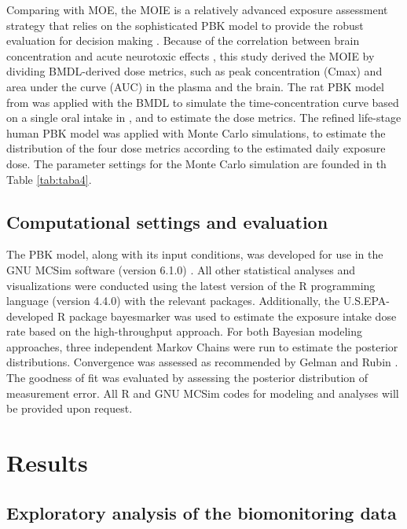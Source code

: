 \documentclass[toxics,article,submit,pdftex,moreauthors]{Definitions/mdpi}
\begin{document}
Comparing with MOE, the MOIE is a relatively advanced exposure
assessment strategy that relies on the sophisticated PBK model to
provide the robust evaluation for decision making
\citep{bessems_margin_2017}. Because of the correlation between brain
concentration and acute neurotoxic effects
\citep{scollon_correlation_2011}, this study derived the MOIE by
dividing BMDL-derived dose metrics, such as peak concentration (Cmax)
and area under the curve (AUC) in the plasma and the brain. The rat PBK
model from \citet{song2019evaluation} was applied with the BMDL to
simulate the time-concentration curve based on a single oral intake in
\citet{wolansky_relative_2006}, and to estimate the dose metrics. The
refined life-stage human PBK model was applied with Monte Carlo
simulations, to estimate the distribution of the four dose metrics
according to the estimated daily exposure dose. The parameter settings
for the Monte Carlo simulation are founded in th Table \ref{tab:taba4}.

\subsection{Computational settings and
evaluation}\label{computational-settings-and-evaluation}

The PBK model, along with its input conditions, was developed for use in
the GNU MCSim software (version 6.1.0) \citep{bois_gnu_2009}. All other
statistical analyses and visualizations were conducted using the latest
version of the R programming language (version 4.4.0) with the relevant
packages. Additionally, the U.S.EPA-developed R package bayesmarker
\citep{stanfield2022bayesian} was used to estimate the exposure intake
dose rate based on the high-throughput approach. For both Bayesian
modeling approaches, three independent Markov Chains were run to
estimate the posterior distributions. Convergence was assessed as
recommended by Gelman and Rubin \citep{gelman1992inference}. The
goodness of fit was evaluated by assessing the posterior distribution of
measurement error. All R and GNU MCSim codes for modeling and analyses
will be provided upon request.

\section{Results}\label{results}

\subsection{Exploratory analysis of the biomonitoring
data}\label{exploratory-analysis-of-the-biomonitoring-data}
\end{document}
